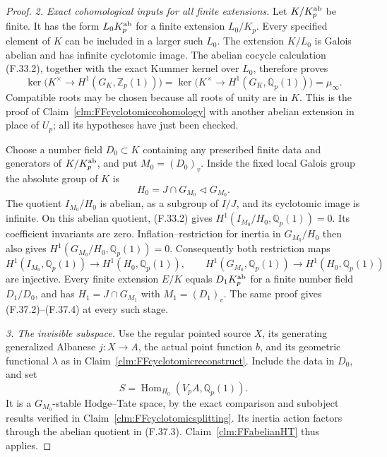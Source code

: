 \documentclass[11pt]{article}
\begin{document}
\begin{proof}
\emph{2. Exact cohomological inputs for all finite extensions.}
Let \(K/K_p^{\rm ab}\) be finite.
It has the form \(L_0K_p^{\rm ab}\)
for a finite extension \(L_0/K_p\).
Every specified element of \(K\)
can be included in a larger such
\(L_0\). The extension \(K/L_0\)
is Galois abelian and has infinite
cyclotomic image. The abelian cocycle
calculation (F.33.2), together with
the exact Kummer kernel over \(L_0\),
therefore proves
\[
 \ker\bigl(K^\times\to H^1(G_K,\mathbb Z_p(1))\bigr)
 =\ker\bigl(K^\times\to H^1(G_K,\mathbb Q_p(1))\bigr)
 =\mu_\infty.
                                                        \tag{F.37.2}
\]
Compatible roots may be chosen because
all roots of unity are in \(K\).
This is the proof of
Claim~\ref{clm:FFcyclotomiccohomology}
with another abelian extension in
place of \(U_p\); all its hypotheses
have just been checked.

Choose a number field \(D_0\subset K\)
containing any prescribed finite data
and generators of \(K/K_p^{\rm ab}\),
and put \(M_0=(D_0)_v\). Inside the
fixed local Galois group the absolute
group of \(K\) is
\[
            H_0=J\cap G_{M_0}
                         \triangleleft G_{M_0}.
                                                        \tag{F.37.3}
\]
The quotient \(I_{M_0}/H_0\) is
abelian, as a subgroup of \(I/J\),
and its cyclotomic image is infinite.
On this abelian quotient, (F.33.2)
gives \(H^1(I_{M_0}/H_0,\mathbb Q_p(1))=0\).
Its coefficient invariants are zero.
Inflation--restriction for inertia
in \(G_{M_0}/H_0\) then also gives
\(H^1(G_{M_0}/H_0,\mathbb Q_p(1))=0\).
Consequently both restriction maps
\[
 H^1(I_{M_0},\mathbb Q_p(1))\longrightarrow H^1(H_0,\mathbb Q_p(1)),
 \qquad
 H^1(G_{M_0},\mathbb Q_p(1))\longrightarrow H^1(H_0,\mathbb Q_p(1))
                                                        \tag{F.37.4}
\]
are injective. Every finite extension
\(E/K\) equals \(D_1K_p^{\rm ab}\)
for a finite number field \(D_1/D_0\),
and has \(H_1=J\cap G_{M_1}\) with
\(M_1=(D_1)_v\). The same proof gives
(F.37.2)--(F.37.4) at every such stage.

\emph{3. The invisible subspace.}
Use the regular pointed source \(X\),
its generating generalized Albanese
\(j:X\to A\), the actual point function
\(b\), and its geometric functional
\(\lambda\) as in
Claim~\ref{clm:FFcyclotomicreconstruct}.
Include the data in \(D_0\), and set
\[
                   S=\operatorname{Hom}_{H_0}
                                (V_pA,\mathbb Q_p(1)).
                                                        \tag{F.37.5}
\]
It is a \(G_{M_0}\)-stable Hodge--Tate
space, by the exact comparison and
subobject results verified in
Claim~\ref{clm:FFcyclotomicsplitting}.
Its inertia action factors through
the abelian quotient in (F.37.3).
Claim~\ref{clm:FFabelianHT} thus applies.


\end{proof}
\end{document}
